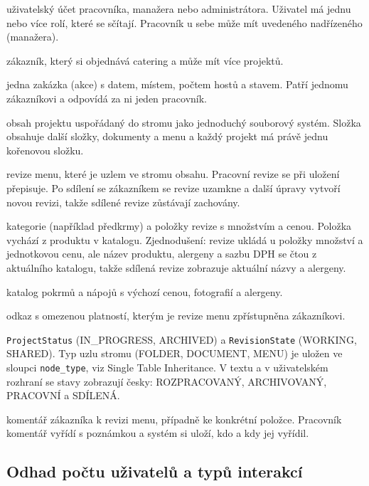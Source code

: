 \begin{description}[itemsep=1pt]
  \item[User, Role] uživatelský účet pracovníka, manažera nebo administrátora. Uživatel má jednu nebo více rolí, které se sčítají. Pracovník u sebe může mít uvedeného nadřízeného (manažera).
  \item[Customer] zákazník, který si objednává catering a může mít více projektů.
  \item[Project] jedna zakázka (akce) s datem, místem, počtem hostů a stavem. Patří jednomu zákazníkovi a odpovídá za ni jeden pracovník.
  \item[ProjectNode, Folder, Document, Menu] obsah projektu uspořádaný do stromu jako jednoduchý souborový systém. Složka obsahuje další složky, dokumenty a menu a každý projekt má právě jednu kořenovou složku.
  \item[MenuRevision] revize menu, které je uzlem ve stromu obsahu. Pracovní revize se při uložení přepisuje. Po sdílení se zákazníkem se revize uzamkne a další úpravy vytvoří novou revizi, takže sdílené revize zůstávají zachovány.
  \item[MenuCategory, MenuItem] kategorie (například předkrmy) a položky revize s množstvím a cenou. Položka vychází z produktu v katalogu. Zjednodušení: revize ukládá u položky množství a jednotkovou cenu, ale název produktu, alergeny a sazbu DPH se čtou z aktuálního katalogu, takže sdílená revize zobrazuje aktuální názvy a alergeny.
  \item[Product, Allergen] katalog pokrmů a nápojů s výchozí cenou, fotografií a alergeny.
  \item[ShareLink] odkaz s omezenou platností, kterým je revize menu zpřístupněna zákazníkovi.
  \item[Výčtové typy] \texttt{ProjectStatus} (IN\_PROGRESS, ARCHIVED) a \texttt{RevisionState} (WORKING, SHARED). Typ uzlu stromu (FOLDER, DOCUMENT, MENU) je uložen ve sloupci \texttt{node\_type}, viz Single Table Inheritance. V textu a v uživatelském rozhraní se stavy zobrazují česky: ROZPRACOVANÝ, ARCHIVOVANÝ, PRACOVNÍ a SDÍLENÁ.
  \item[Comment] komentář zákazníka k revizi menu, případně ke konkrétní položce. Pracovník komentář vyřídí s poznámkou a systém si uloží, kdo a kdy jej vyřídil.
\end{description}

\subsection{Odhad počtu uživatelů a typů interakcí}

